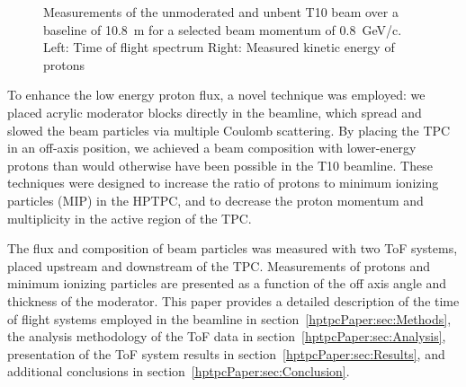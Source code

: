 \begin{figure}
  \begin{minipage}[t]{0.49\textwidth}
    \centering
    \begin{adjustbox}{max totalsize={\textwidth},center}
      
    \end{adjustbox}
  \end{minipage}
  \hfill
  \begin{minipage}[t]{0.49\textwidth}
    \centering
    \begin{adjustbox}{max totalsize={\textwidth},center}
      
    \end{adjustbox}
  \end{minipage}
  \caption{\label{fig:utofNoBend}Measurements of the unmoderated and unbent T10 beam over a baseline of 10.8~m for a selected beam momentum of 0.8~GeV/c. Left: Time of flight spectrum Right: Measured kinetic energy of protons}
\end{figure}

To enhance the low energy proton flux, a novel technique was employed:
we placed acrylic moderator blocks directly in the beamline, which spread and slowed the beam particles via multiple Coulomb scattering.
By placing the TPC in an off-axis position, we achieved a beam composition with lower-energy protons than would otherwise have been possible in the T10 beamline.
These techniques were designed to increase the ratio of protons to minimum ionizing particles (MIP) in the HPTPC, and to decrease the proton momentum and multiplicity in the active region of the TPC.

The flux and composition of beam particles was measured with two ToF systems, placed upstream and downstream of the TPC.
Measurements of protons and minimum ionizing particles are presented as a function of the off axis angle and thickness of the moderator.
This paper provides a detailed description of the time of flight systems employed in the beamline in section~\ref{hptpcPaper:sec:Methods}, the analysis methodology of the ToF data in section~\ref{hptpcPaper:sec:Analysis}, presentation of the ToF system results in section~\ref{hptpcPaper:sec:Results}, and additional conclusions in section~\ref{hptpcPaper:sec:Conclusion}.
